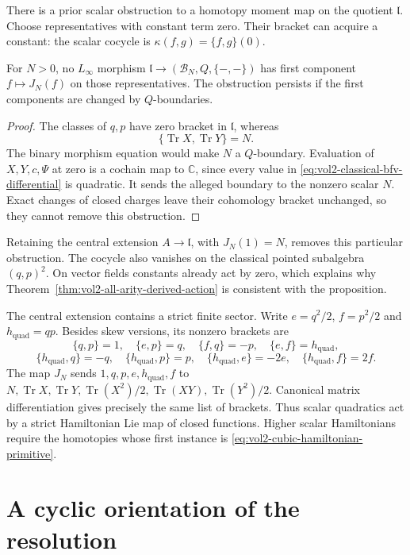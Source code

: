 There is a prior scalar obstruction to a homotopy moment map
on the quotient $\mathfrak l$. Choose representatives with
constant term zero. Their bracket can acquire a constant:
the scalar cocycle is $\kappa(f,g)=\{f,g\}(0)$.

\begin{proposition}\label{prop:vol2-moment-central-obstruction}
For $N>0$, no $L_\infty$ morphism
$\mathfrak l\to(\mathcal B_N,Q,\{-,-\})$ has first component
$f\mapsto J_N(f)$ on those representatives. The obstruction
persists if the first components are changed by $Q$-boundaries.
\end{proposition}
\begin{proof}
The classes of $q,p$ have zero bracket in $\mathfrak l$, whereas
\[
 \{\operatorname{Tr}X,\operatorname{Tr}Y\}=N.
\]
The binary morphism equation would make $N$ a $Q$-boundary.
Evaluation of $X,Y,c,\Psi$ at zero is a cochain map to
$\mathbb C$, since every value in
\eqref{eq:vol2-classical-bfv-differential} is quadratic.
It sends the alleged boundary to the nonzero scalar $N$.
Exact changes of closed charges leave their cohomology bracket
unchanged, so they cannot remove this obstruction.
\end{proof}

Retaining the central extension $A\to\mathfrak l$, with
$J_N(1)=N$, removes this particular obstruction. The cocycle
also vanishes on the classical pointed subalgebra $(q,p)^2$.
On vector fields constants already act by zero, which explains
why Theorem~\ref{thm:vol2-all-arity-derived-action} is consistent
with the proposition.

The central extension contains a strict finite sector. Write
$e=q^2/2$, $f=p^2/2$ and $h_{\mathrm{quad}}=qp$.
Besides skew versions, its
nonzero brackets are
\[
 \{q,p\}=1,\quad\{e,p\}=q,\quad\{f,q\}=-p,
 \quad\{e,f\}=h_{\mathrm{quad}},
\]
\[
 \{h_{\mathrm{quad}},q\}=-q,\quad
 \{h_{\mathrm{quad}},p\}=p,\quad
 \{h_{\mathrm{quad}},e\}=-2e,\quad
 \{h_{\mathrm{quad}},f\}=2f.
\]
The map $J_N$ sends $1,q,p,e,h_{\mathrm{quad}},f$ to
$N,\operatorname{Tr}X,\operatorname{Tr}Y,
\operatorname{Tr}(X^2)/2,\operatorname{Tr}(XY),
\operatorname{Tr}(Y^2)/2$. Canonical matrix differentiation
gives precisely the same list of brackets. Thus scalar
quadratics act by a strict Hamiltonian Lie map of closed
functions. Higher scalar Hamiltonians require the homotopies
whose first instance is \eqref{eq:vol2-cubic-hamiltonian-primitive}.

\section{A cyclic orientation of the resolution}
\label{sec:vol2-derived-cyclic-orientation}

